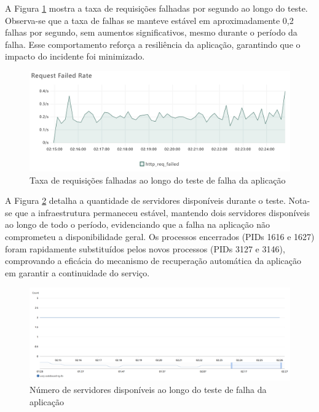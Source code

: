 A Figura \ref{fig:process-failing-req-failed-rate} mostra a taxa de requisições falhadas por segundo ao longo do teste. Observa-se que a taxa de falhas se manteve estável em aproximadamente 0,2 falhas por segundo, sem aumentos significativos, mesmo durante o período da falha. Esse comportamento reforça a resiliência da aplicação, garantindo que o impacto do incidente foi minimizado.

\begin{figure}[H]
    \centering
    \includegraphics[width=1\textwidth]{assets/process-failing-test/req-failed-rate.png}
    \caption{Taxa de requisições falhadas ao longo do teste de falha da aplicação}
    \label{fig:process-failing-req-failed-rate}
\end{figure}

A Figura \ref{fig:process-failing-healthy-hosts} detalha a quantidade de servidores disponíveis durante o teste. Nota-se que a infraestrutura permaneceu estável, mantendo dois servidores disponíveis ao longo de todo o período, evidenciando que a falha na aplicação não comprometeu a disponibilidade geral. Os processos encerrados (PIDs 1616 e 1627) foram rapidamente substituídos pelos novos processos (PIDs 3127 e 3146), comprovando a eficácia do mecanismo de recuperação automática da aplicação em garantir a continuidade do serviço.

\begin{figure}[H]
    \centering
    \includegraphics[width=1\textwidth]{assets/process-failing-test/healthy-hosts.png}
    \caption{Número de servidores disponíveis ao longo do teste de falha da aplicação}
    \label{fig:process-failing-healthy-hosts}
\end{figure}


